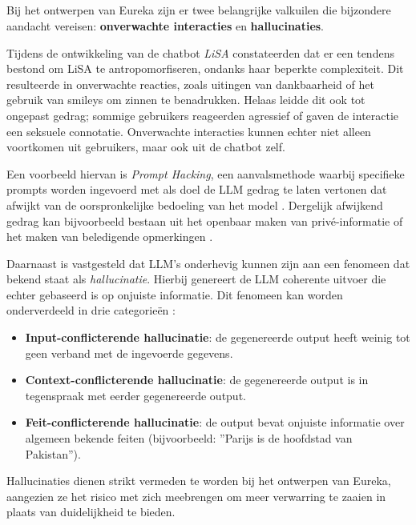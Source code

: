 \subsection{}%
\label{subsec:valkuilen}

Bij het ontwerpen van Eureka zijn er twee belangrijke valkuilen die bijzondere aandacht vereisen: \textbf{onverwachte interacties} en \textbf{hallucinaties}.

Tijdens de ontwikkeling van de chatbot \textit{LiSA} constateerden \textcite{Dibitonto2018} dat er een tendens bestond om LiSA te antropomorfiseren, ondanks haar beperkte complexiteit. Dit resulteerde in onverwachte reacties, zoals uitingen van dankbaarheid of het gebruik van smileys om zinnen te benadrukken. Helaas leidde dit ook tot ongepast gedrag; sommige gebruikers reageerden agressief of gaven de interactie een seksuele connotatie. Onverwachte interacties kunnen echter niet alleen voortkomen uit gebruikers, maar ook uit de chatbot zelf.

Een voorbeeld hiervan is \textit{Prompt Hacking}, een aanvalsmethode waarbij specifieke prompts worden ingevoerd met als doel de LLM gedrag te laten vertonen dat afwijkt van de oorspronkelijke bedoeling van het model \autocite{Rababah2024}. Dergelijk afwijkend gedrag kan bijvoorbeeld bestaan uit het openbaar maken van privé-informatie of het maken van beledigende opmerkingen \autocite{Naveed2023}.

Daarnaast is vastgesteld dat LLM's onderhevig kunnen zijn aan een fenomeen dat bekend staat als \textit{hallucinatie}. Hierbij genereert de LLM coherente uitvoer die echter gebaseerd is op onjuiste informatie. Dit fenomeen kan worden onderverdeeld in drie categorieën \autocite{Naveed2023}:

\begin{itemize} 
    \item \textbf{Input-conflicterende hallucinatie}: de gegenereerde output heeft weinig tot geen verband met de ingevoerde gegevens. 
    \item \textbf{Context-conflicterende hallucinatie}: de gegenereerde output is in tegenspraak met eerder gegenereerde output. 
    \item \textbf{Feit-conflicterende hallucinatie}: de output bevat onjuiste informatie over algemeen bekende feiten (bijvoorbeeld: ''Parijs is de hoofdstad van Pakistan''). 
\end{itemize}

Hallucinaties dienen strikt vermeden te worden bij het ontwerpen van Eureka, aangezien ze het risico met zich meebrengen om meer verwarring te zaaien in plaats van duidelijkheid te bieden.

